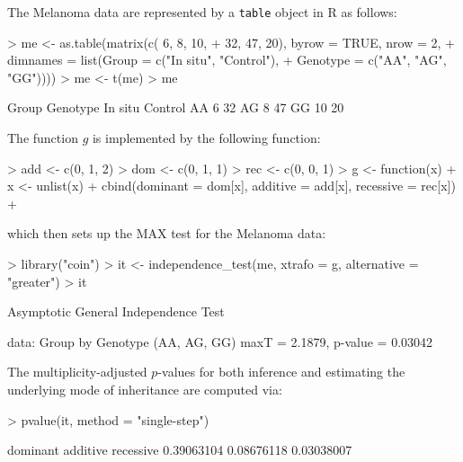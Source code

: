 \documentclass[bimj,fleqn]{w-art}
\begin{document}
The Melanoma data are represented by a \texttt{table} object in \textsf{R}
as follows:
\begin{Schunk}
\begin{Sinput}
> me <- as.table(matrix(c( 6,  8, 10,
+                32, 47, 20), byrow = TRUE, nrow = 2,
+     dimnames = list(Group = c("In situ", "Control"),
+                     Genotype = c("AA", "AG", "GG"))))
> me <- t(me)
> me
\end{Sinput}
\begin{Soutput}
        Group
Genotype In situ Control
      AA       6      32
      AG       8      47
      GG      10      20
\end{Soutput}
\end{Schunk}
The function $g$ is implemented by the following function:
\begin{Schunk}
\begin{Sinput}
> add <- c(0, 1, 2)
> dom <- c(0, 1, 1)
> rec <- c(0, 0, 1)
> g <- function(x) {
+     x <- unlist(x)
+     cbind(dominant = dom[x], additive = add[x], recessive = rec[x])
+ }
\end{Sinput}
\end{Schunk}
which then sets up the MAX test for the Melanoma data:
\begin{Schunk}
\begin{Sinput}
> library("coin")
> it <- independence_test(me, xtrafo = g, alternative = "greater")
> it
\end{Sinput}
\begin{Soutput}
	Asymptotic General Independence Test

data:  Group by Genotype (AA, AG, GG) 
maxT = 2.1879, p-value = 0.03042
\end{Soutput}
\end{Schunk}
The multiplicity-adjusted $p$-values for both inference and
estimating the underlying mode of inheritance are computed 
via:
\begin{Schunk}
\begin{Sinput}
> pvalue(it, method = "single-step")
\end{Sinput}
\end{Schunk}
\begin{Schunk}
\begin{Soutput}
  dominant   additive  recessive 
0.39063104 0.08676118 0.03038007 
\end{Soutput}
\end{Schunk}
\end{document}
